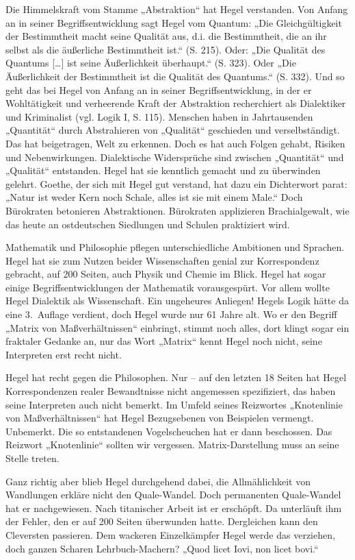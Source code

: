 \documentclass[11pt,a4paper]{article}
\begin{document}
Die Himmelskraft vom Stamme „Abstraktion“ hat Hegel verstanden. Von Anfang an
in seiner Begriffsentwicklung sagt Hegel vom Quantum: „Die Gleichgültigkeit
der Bestimmtheit macht seine Qualität aus, d.i. die Bestimmtheit, die an ihr
selbst als die äußerliche Bestimmtheit ist.“ (S. 215). Oder: „Die Qualität des
Quantums [\ldots] ist seine Äußerlichkeit überhaupt.“ (S. 323). Oder „Die
Äußerlichkeit der Bestimmtheit ist die Qualität des Quantums.“ (S. 332). Und
so geht das bei Hegel von Anfang an in seiner Begriffsentwicklung, in der er
Wohltätigkeit und verheerende Kraft der Abstraktion recherchiert als
Dialektiker und Kriminalist (vgl. Logik I, S. 115). Menschen haben in
Jahrtausenden „Quantität“ durch Abstrahieren von „Qualität“ geschieden und
verselbständigt. Das hat beigetragen, Welt zu erkennen. Doch es hat auch
Folgen gehabt, Risiken und Nebenwirkungen. Dialektische Widersprüche sind
zwischen „Quantität“ und „Qualität“ entstanden. Hegel hat sie kenntlich
gemacht und zu überwinden gelehrt. Goethe, der sich mit Hegel gut verstand,
hat dazu ein Dichterwort parat: „Natur ist weder Kern noch Schale, alles ist
sie mit einem Male.“ Doch Bürokraten betonieren Abstraktionen. Bürokraten
applizieren Brachialgewalt, wie das heute an ostdeutschen Siedlungen und
Schulen praktiziert wird.

Mathematik und Philosophie pflegen unterschiedliche Ambitionen und Sprachen.
Hegel hat sie zum Nutzen beider Wissenschaften genial zur Korrespondenz
gebracht, auf 200 Seiten, auch Physik und Chemie im Blick. Hegel hat sogar
einige Begriffsentwicklungen der Mathematik vorausgespürt. Vor allem wollte
Hegel Dialektik als Wissenschaft. Ein ungeheures Anliegen! Hegels Logik hätte
da eine 3.~Auflage verdient, doch Hegel wurde nur 61 Jahre alt. Wo er den
Begriff „Matrix von Maßverhältnissen“ einbringt, stimmt noch alles, dort
klingt sogar ein fraktaler Gedanke an, nur das Wort „Matrix“ kennt Hegel noch
nicht, seine Interpreten erst recht nicht.

Hegel hat recht gegen die Philosophen. Nur -- auf den letzten 18 Seiten hat
Hegel Korrespondenzen realer Bewandtnisse nicht angemessen spezifiziert, das
haben seine Interpreten auch nicht bemerkt. Im Umfeld seines Reizwortes
„Knotenlinie von Maßverhältnissen“ hat Hegel Bezugsebenen von Beispielen
vermengt. Unbemerkt. Die so entstandenen Vogelscheuchen hat er dann
beschossen.  Das Reizwort „Knotenlinie“ sollten wir vergessen.
Matrix-Darstellung muss an seine Stelle treten.

Ganz richtig aber blieb Hegel durchgehend dabei, die Allmählichkeit von
Wandlungen erkläre nicht den Quale-Wandel. Doch permanenten Quale-Wandel hat
er nachgewiesen. Nach titanischer Arbeit ist er erschöpft. Da unterläuft ihm
der Fehler, den er auf 200 Seiten überwunden hatte. Dergleichen kann den
Cleversten passieren. Dem wackeren Einzelkämpfer Hegel werde das verziehen,
doch ganzen Scharen Lehrbuch-Machern? „Quod licet Iovi, non licet bovi.“
\end{document}
